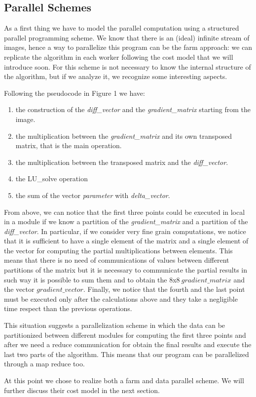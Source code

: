 \subsection{Parallel Schemes}

As a first thing we have to model the parallel computation using a structured parallel programming scheme. We know that there is an (ideal) infinite stream of images, hence a way to parallelize this program can be the farm approach: we can replicate the algorithm in each worker following the cost model that we will introduce soon. For this scheme is not necessary to know the internal structure of the algorithm, but if we analyze it, we recognize some interesting aspects.

Following the pseudocode in Figure 1 we have:
\begin{enumerate}
\item the construction of the \textit{diff\_vector} and the \textit{gradient\_matrix} starting from the image.
\item the multiplication between the \textit{gradient\_matrix} and its own transposed matrix, that is the main operation.
\item the multiplication between the transposed matrix and the \textit{diff\_vector}.
\item the LU\_solve operation
\item the sum of the vector \textit{parameter} with \textit{delta\_vector}.
\end{enumerate}

From above, we can notice that the first three points could be executed in local in a module if we know a partition of the \textit{gradient\_matrix} and a partition of the \textit{diff\_vector}. In particular, if we consider very fine grain computations, we notice that it is sufficient to have a single element of the matrix and a single element of the vector for computing the partial multiplications between elements. This means that there is no need of communications of values between different partitions of the matrix but it is necessary to communicate the partial results in such way it is possible to sum them and to obtain the $8$x$8\ gradient\_matrix$ and the vector $gradient\_vector$. Finally, we notice that the fourth and the last point must be executed only after the calculations above and they take a negligible time respect than the previous operations.

This situation suggests a parallelization scheme in which the data can be partitionized between different modules for computing the first three points and after we need a reduce communication for obtain the final results and execute the last two parts of the algorithm. This means that our program can be parallelized through a map reduce too.

At this point we chose to realize both a farm and data parallel scheme. We will further discuss their cost model in the next section.